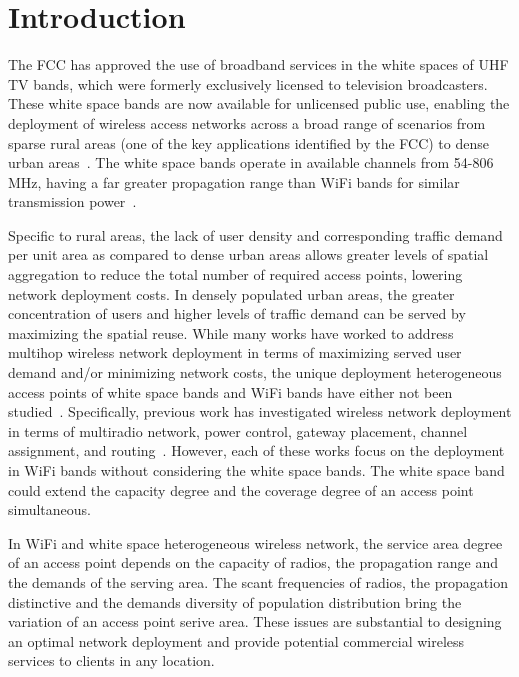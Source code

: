 \section{Introduction}
\label{sec:introduction}



The FCC has approved the use of broadband services in the white spaces of 
UHF TV bands, which were formerly exclusively licensed to television broadcasters.
These white space bands are now available for unlicensed public use, enabling the
deployment of wireless access networks across a broad range of scenarios from 
sparse rural areas (one of the key applications identified by the FCC) to dense urban 
areas~\cite{carlson}. The white space bands operate in available channels from 
54-806 MHz, having a far greater propagation range than WiFi bands for similar
transmission power~\cite{balanis2012antenna}. 

Specific to rural areas, the lack of user density and corresponding traffic
demand per unit area as compared to dense urban areas allows greater levels of
spatial aggregation to reduce the total number of required access points, lowering
network deployment costs. In densely populated urban areas, the greater concentration
of users and higher levels of traffic demand can be served by maximizing the spatial
reuse. While many works have worked to address multihop wireless network deployment
in terms of maximizing served user demand and/or minimizing network costs,
the unique deployment heterogeneous access points of white space bands and 
WiFi bands have either not been studied~\cite{si2010overview}. 
Specifically, previous work has investigated wireless network deployment in terms of 
multiradio network, power control, gateway placement, channel assignment, 
and routing~\cite{kodialam2005characterizing,he2008optimizing,marina2010topology}.
However, each of these works focus on the deployment in WiFi bands without
considering the white space bands. The white space band could extend the capacity 
degree and the coverage degree of an access point simultaneous. 

In WiFi and white space heterogeneous wireless network, the service area degree of 
an access point depends on the capacity of radios, the propagation range and the 
demands of the serving area. The scant frequencies of radios, the propagation distinctive
and the demands diversity of population distribution bring the variation of an access point
serive area. These issues are substantial to designing an optimal network deployment 
and provide potential commercial wireless services to clients in any location.

